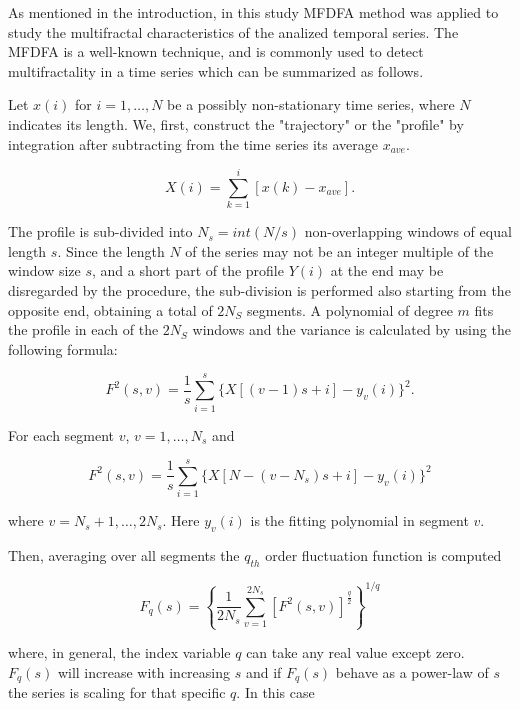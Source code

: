 \documentclass[onecolumn, preprint,aps,amsmath, amssymb, superscriptaddress]{revtex4}
\begin{document}
As mentioned in the introduction, in this study MFDFA method was applied to study the multifractal characteristics of the analized temporal series. The MFDFA is a well-known technique, and is commonly used to detect multifractality in a time series \cite{Kantelhardt} which can be summarized as follows.

Let $x(i)$ for $i=1,\ldots,N$ be a possibly non-stationary time series, where $N$ indicates its length. We, first, construct the "trajectory" or the "profile" by integration after subtracting from the time series its average $x_{ave}$.

\begin{equation}
X(i)=\sum_{k=1}^i[x(k)-x_{ave}].
\label{eq:signal}
\end{equation}

The profile is sub-divided into $N_s=int(N/s)$ non-overlapping windows of equal length $s$. Since the length $N$ of the series may not be an integer multiple of the window size $s$, and a short part of the profile $Y(i)$ at the end may be disregarded by the procedure, the sub-division is performed also starting from the opposite end, obtaining a total of $2N_S$ segments. A polynomial of degree $m$ fits the profile in each of the $2N_S$ windows and the variance is calculated by using the following formula:

\begin{equation}
F^2 (s,v)=\frac{1}{s} \sum_{i=1}^s\{X[(v-1)s+i]-y_v (i)\}^2.
\label{eq:var1}
\end{equation}

For each segment $v$, $v=1,\ldots,N_s$  and
 
\begin{equation}
F^2 (s,v)=\frac{1}{s} \sum_{i=1}^s\{X[N-(v-N_s )s+i]-y_v (i)\}^2
\label{eq:var2}
\end{equation}

where $v=N_s+1,\ldots,2N_s$. Here $y_v (i)$  is the fitting polynomial in segment $v$. 

Then, averaging over all segments the $q_{th}$ order fluctuation function is computed

\begin{equation}
F_q (s)=\left\lbrace \frac{1}{2N_s} \sum_{v=1}^{2N_s}[F^2 (s,v)]^{\frac{q}{2}}\right\rbrace ^{1/q}
\label{eq_f}  
\end{equation}

where, in general, the index variable $q$ can take any real value except zero. $F_q (s)$ will increase with increasing $s$ and if $F_q (s)$  behave as a power-law of $s$ the series is scaling for that specific $q$. In this case
\end{document}
